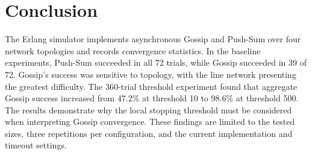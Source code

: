 \documentclass[11pt]{article}
\begin{document}
\section{Conclusion}
The Erlang simulator implements asynchronous Gossip and Push-Sum
over four network topologies and records convergence statistics.
In the baseline experiments, Push-Sum succeeded in all 72 trials,
while Gossip succeeded in 39 of 72. Gossip's success was sensitive
to topology, with the line network presenting the greatest
difficulty.
The 360-trial threshold experiment found that aggregate Gossip
success increased from 47.2\% at threshold 10 to 98.6\% at threshold
500. The results demonstrate why the local stopping threshold must
be considered when interpreting Gossip convergence. These findings
are limited to the tested sizes, three repetitions per configuration,
and the current implementation and timeout settings.
\end{document}
